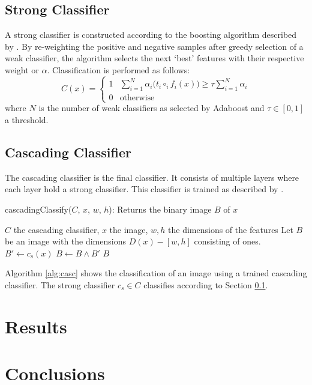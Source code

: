 \documentclass[a4paper,11pt]{article}
\begin{document}
\subsection{Strong Classifier} \label{sec:strong}
A strong classifier is constructed according to the boosting algorithm
described by \cite{viola}. By re-weighting the positive and negative samples
after greedy selection of a weak classifier, the algorithm selects the next
`best' features with their respective weight or $\alpha$. Classification is
performed as follows:
\begin{displaymath}
C(x) = 
	\left\{ \begin{array}{ll}
		1 & \sum^N_{i=1} \alpha_i \big(t_i \circ_i f_i(x)\big) \ge \tau \sum^N_{i=1}\alpha_i \\
		0 & \textrm{otherwise}
	\end{array} \right.
\end{displaymath}
where $N$ is the number of weak classifiers as selected by Adaboost and $\tau
\in [0,1]$ a threshold.

\subsection{Cascading Classifier} \label{sec:casc}
The cascading classifier is the final classifier. It consists of multiple
layers where each layer hold a strong classifier. This classifier is
trained as described by \cite{viola}. 
\begin{algorithm}
	\caption{cascadingClassify($C$, $x$, $w$, $h$): Returns the binary image $B$ of $x$}
	\begin{algorithmic}[1]
	\REQUIRE $C$ the cascading classifier, $x$ the image, $w,h$ the dimensions of the features
	\medskip
	\STATE Let $B$ be an image with the dimensions $D(x) - [w,h]$ consisting of ones.
		\STATE $B' \leftarrow c_s(x)$
		\STATE $B \leftarrow B \land B'$
	\ENDFOR
	\RETURN $B$
	\end{algorithmic}
\label{alg:casc}
\end{algorithm}
Algorithm \ref{alg:casc} shows the classification of an image using a trained
cascading classifier. The strong classifier $c_s \in C$ classifies according to
Section \ref{sec:strong}.

\section{Results} \label{sec:res}

\section{Conclusions} \label{sec:conc}

\renewcommand\bibname{References}


\end{document}
